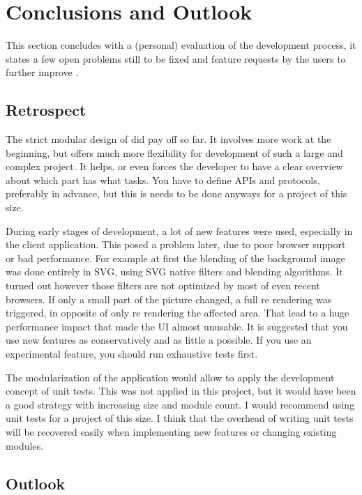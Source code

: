 \section{Conclusions and Outlook}
\label{sec:outlook}

This section concludes with a (personal) evaluation of the development process, it states a few open problems still to be fixed and feature requests by the users to further improve \spl.

\subsection{Retrospect}

The strict modular design of \spl did pay off so far.
It involves more work at the beginning, but offers much more flexibility for development of such a large and complex project.
It helps, or even forces the developer to have a clear overview about which part has what tasks.
You have to define APIs and protocols, preferably in advance, but this is needs to be done anyways for a project of this size.

During early stages of development, a lot of new features were used, especially in the client application.
This posed a problem later, due to poor browser support or bad performance.
For example at first the blending of the background image was done entirely in SVG, using SVG native filters and blending algorithms.
It turned out however those filters are not optimized by most of even recent browsers.
If only a small part of the picture changed, a full re rendering was triggered, in opposite of only re rendering the affected area.
That lead to a huge performance impact that made the UI almost unusable.
It is suggested that you use new features as conservatively and as little a possible.
If you use an experimental feature, you should run exhaustive tests first.

The modularization of the application would allow to apply the development concept of unit tests.
This was not applied in this project, but it would have been a good strategy with increasing size and module count.
I would recommend using unit tests for a project of this size.
I think that the overhead of writing unit tests will be recovered easily when implementing new features or changing existing modules.


\subsection{Outlook}

